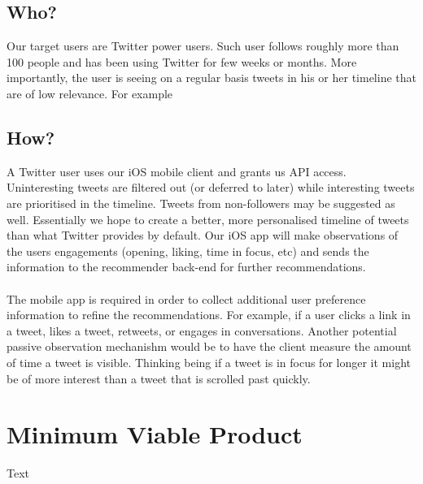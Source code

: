 \documentclass{article}
\begin{document}
\subsection{Who?}
Our target users are Twitter power users. Such user follows roughly more than 100 people and has been using Twitter for few weeks or months. More importantly, the user is seeing on a regular basis tweets in his or her timeline that are of low relevance. For example 

\subsection{How?}
A Twitter user uses our iOS mobile client and grants us API access. Uninteresting tweets are filtered out (or deferred to later) while interesting tweets are prioritised in the timeline. Tweets from non-followers may be suggested as well. Essentially we hope to create a better, more personalised timeline of tweets than what Twitter provides by default. Our iOS app will make observations of the users engagements (opening, liking, time in focus, etc) and sends the information to the recommender back-end for further recommendations.
\\\\
The mobile app is required in order to collect additional user preference information to refine the recommendations. For example, if a user clicks a link in a tweet, likes a tweet, retweets, or engages in conversations. Another potential passive observation mechanishm would be to have the client measure the amount of time a tweet is visible. Thinking being if a tweet is in focus for longer it might be of more interest than a tweet that is scrolled past quickly.


\section{Minimum Viable Product}
% 

Text
\end{document}
